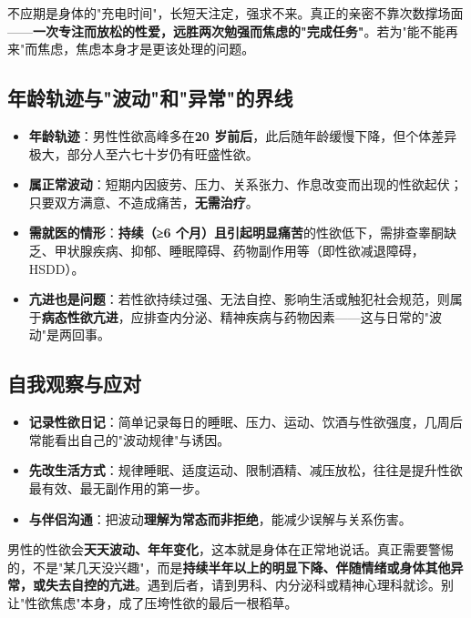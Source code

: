 \begin{tcolorbox}[colback=pink!5!white,colframe=red!50!black,title=贴心小叮咛]
不应期是身体的"充电时间"，长短天注定，强求不来。真正的亲密不靠次数撑场面——\textbf{一次专注而放松的性爱，远胜两次勉强而焦虑的"完成任务"}。若为"能不能再来"而焦虑，焦虑本身才是更该处理的问题。
\end{tcolorbox}

\subsection{年龄轨迹与"波动"和"异常"的界线}

\begin{itemize}
	\item \textbf{年龄轨迹}：男性性欲高峰多在\textbf{20 岁前后}，此后随年龄缓慢下降，但个体差异极大，部分人至六七十岁仍有旺盛性欲。
	\item \textbf{属正常波动}：短期内因疲劳、压力、关系张力、作息改变而出现的性欲起伏；只要双方满意、不造成痛苦，\textbf{无需治疗}。
	\item \textbf{需就医的情形}：\textbf{持续（≥6 个月）且引起明显痛苦}的性欲低下，需排查睾酮缺乏、甲状腺疾病、抑郁、睡眠障碍、药物副作用等（即性欲减退障碍，HSDD）。
	\item \textbf{亢进也是问题}：若性欲持续过强、无法自控、影响生活或触犯社会规范，则属于\textbf{病态性欲亢进}，应排查内分泌、精神疾病与药物因素——这与日常的"波动"是两回事。
\end{itemize}

\subsection{自我观察与应对}

\begin{itemize}
	\item \textbf{记录性欲日记}：简单记录每日的睡眠、压力、运动、饮酒与性欲强度，几周后常能看出自己的"波动规律"与诱因。
	\item \textbf{先改生活方式}：规律睡眠、适度运动、限制酒精、减压放松，往往是提升性欲最有效、最无副作用的第一步。
	\item \textbf{与伴侣沟通}：把波动\textbf{理解为常态而非拒绝}，能减少误解与关系伤害。
\end{itemize}

\begin{tcolorbox}[colback=blue!5!white,colframe=blue!50!black,title=贴心小叮咛]
男性的性欲会\textbf{天天波动、年年变化}，这本就是身体在正常地说话。真正需要警惕的，不是"某几天没兴趣"，而是\textbf{持续半年以上的明显下降、伴随情绪或身体其他异常，或失去自控的亢进}。遇到后者，请到男科、内分泌科或精神心理科就诊。别让"性欲焦虑"本身，成了压垮性欲的最后一根稻草。
\end{tcolorbox}


